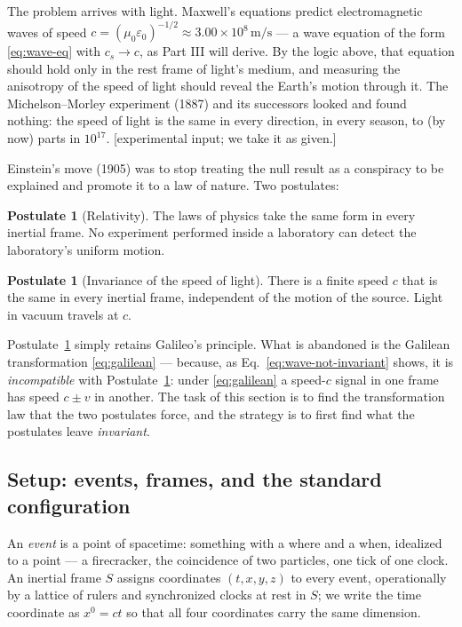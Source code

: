 \documentclass[11pt]{article}
\theoremstyle{plain}
\theoremstyle{definition}
\newtheorem{postulate}[theorem]{Postulate}
\theoremstyle{remark}
\begin{document}
The problem arrives with light. Maxwell's equations predict
electromagnetic waves of speed
$c = (\mu_0\varepsilon_0)^{-1/2} \approx 3.00\times 10^8\,\mathrm{m/s}$
--- a wave equation of the form \eqref{eq:wave-eq} with $c_s \to c$, as
Part III will derive. By the logic above, that equation should hold only
in the rest frame of light's medium, and measuring the anisotropy of the
speed of light should reveal the Earth's motion through it. The
Michelson--Morley experiment (1887) and its successors looked and found
nothing: the speed of light is the same in every direction, in every
season, to (by now) parts in $10^{17}$. [experimental input; we take it
as given.]

Einstein's move (1905) was to stop treating the null result as a
conspiracy to be explained and promote it to a law of nature. Two
postulates:

\begin{postulate}[Relativity]\label{post:relativity}
The laws of physics take the same form in every inertial frame. No
experiment performed inside a laboratory can detect the laboratory's
uniform motion.
\end{postulate}

\begin{postulate}[Invariance of the speed of light]\label{post:light}
There is a finite speed $c$ that is the same in every inertial frame,
independent of the motion of the source. Light in vacuum travels at $c$.
\end{postulate}

\noindent
Postulate~\ref{post:relativity} simply retains Galileo's principle. What is abandoned is
the Galilean transformation \eqref{eq:galilean} --- because, as
Eq.~\eqref{eq:wave-not-invariant} shows, it is \emph{incompatible} with
Postulate~\ref{post:light}: under \eqref{eq:galilean} a speed-$c$ signal
in one frame has speed $c \pm v$ in another. The task of this section is
to find the transformation law that the two postulates force, and the
strategy is to first find what the postulates leave \emph{invariant}.

\subsection{Setup: events, frames, and the standard configuration}
\label{sec:setup}

An \emph{event} is a point of spacetime: something with a where and a
when, idealized to a point --- a firecracker, the coincidence of two
particles, one tick of one clock. An inertial frame $S$ assigns
coordinates $(t, x, y, z)$ to every event, operationally by a lattice of
rulers and synchronized clocks at rest in $S$; we write the time
coordinate as $x^0 = ct$ so that all four coordinates carry the same
dimension.
\end{document}
